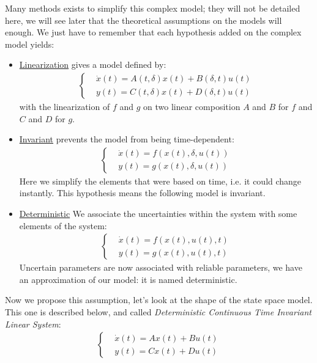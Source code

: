 Many methods exists to simplify this complex model; they will not be detailed here, we will see later that the theoretical assumptions on the models will enough. We just have to remember that each hypothesis added on the complex model yields: \begin{itemize}
\item \underline{Linearization} gives a model defined by:
\begin{eqnarray} \label{equationSystem_Linear}
\left\lbrace
\begin{aligned}
&\dot{x}(t)= A(t, \delta)x(t) + B(\delta, t)u(t)\\ %
&y(t) = C(t, \delta)x(t) + D(\delta, t)u(t) 
\end{aligned} 
\right.
\end{eqnarray} with the linearization of $f$ and $g$ on two linear composition $A$ and $B$ for $f$ and $C$ and $D$ for $g$.
\item \underline{Invariant} prevents the model from being time-dependent:
\begin{eqnarray} \label{equationSystem_Invariant}
\left\lbrace
\begin{aligned}
&\dot{x}(t)= f(x(t), \delta, u(t))\\ %
&y(t) = g(x(t), \delta, u(t)) 
\end{aligned} 
\right.
\end{eqnarray} Here we simplify the elements that were based on time, i.e. it could change instantly. This hypothesis means the following model is invariant.
\item \underline{Deterministic} We associate the uncertainties within the system with some elements of the system:
\begin{eqnarray} \label{equationSystem_Invariant}
\left\lbrace
\begin{aligned}
&\dot{x}(t)= f(x(t), u(t), t)\\ %
&y(t) = g(x(t), u(t), t) 
\end{aligned} 
\right.
\end{eqnarray} Uncertain parameters are now associated with reliable parameters, we have an approximation of our model: it is named deterministic.
\end{itemize}

Now we propose this assumption, let's look at the shape of the state space model. This one is described below, and called \emph{Deterministic Continuous Time Invariant Linear System}: 
\begin{eqnarray} \label{equationSystem_DCTIL}
\left\lbrace
\begin{aligned}
&\dot{x}(t)= Ax(t) + Bu(t)\\ %
&y(t) = Cx(t) + Du(t)
\end{aligned} 
\right.
\end{eqnarray}

